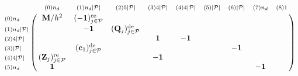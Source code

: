 \documentclass[a4paper,10pt]{article}
\begin{document}
\begin{equation}\notag
\bordermatrix{
                                    &    \scriptstyle{(0) n_d}                      &              \scriptstyle{(1) n_d |\mathcal{P}|}          &        \scriptstyle{(2) 5 |\mathcal{P}|}       &  \scriptstyle{(3) 4 |\mathcal{P}|}   & \scriptstyle{(4) 4|\mathcal{P}|}    &   \scriptstyle{(5) |\mathcal{P}| }  & \scriptstyle{(6) |\mathcal{P}| }  & \scriptstyle{(7) n_d}  &   \scriptstyle{(8) 1 } \cr
\scriptstyle{(0) n_d}               &  \mathbf{M}/h^2                               & (-\mathbf{1})_{j \in \mathcal{P}}^\text{ce}               &                                                &                                      &                                     &                                     &                                   &                        &                        \cr
\scriptstyle{(1) n_d |\mathcal{P}|} &                                               &  -\mathbf{1}                                              &  (\mathbf{Q}_j)_{j \in \mathcal{P}}^\text{de}  &                                      &                                     &                                     &                                   &                        &                        \cr
\scriptstyle{(2) 4 |\mathcal{P}|}   &                                               &                                                           &                                                &  \mathbf{1}                          &  -\mathbf{1}                        &                                     &                                   &                        &                        \cr
\scriptstyle{(3)   |\mathcal{P}|}   &                                               & (\mathbf{c}_1)_{j \in \mathcal{P}}^\text{de}              &                                                &                                      &                                     &                                     & -\mathbf{1}                       &                        &                        \cr
\scriptstyle{(4) 4 |\mathcal{P}|}   &  (\mathbf{Z}_j)_{j \in \mathcal{P}}^\text{re} &                                                           &                                                &  -\mathbf{1}                         &                                     &                                     &                                   &                        &                        \cr
\scriptstyle{(5) n_d}               &  \mathbf{1}                                   &                                                           &                                                &                                      &                                     &                                     &                                   & -\mathbf{1}            & 
}
\end{equation}
\end{document}
